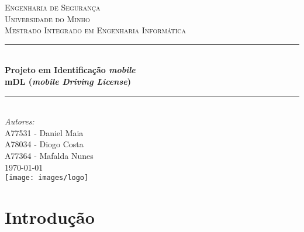 \documentclass[11pt]{article}
\begin{document}
\sloppy

\begin{titlepage}

\newcommand{\HRule}{\rule{\linewidth}{0.5mm}}

\center %
 
\textsc{\LARGE Engenharia de Segurança}\\[1.5cm]
\textsc{\Large Universidade do Minho}\\[0.5cm]
\textsc{\large Mestrado Integrado em Engenharia Informática}\\[0.6cm]

\vspace{0.8cm}
\HRule \\[0.6cm]
{ \huge \bfseries Projeto em Identificação \textit{mobile}}\\[0.4cm]
{ \Large \bfseries \textbf{mDL} (\textit{mobile Driving License})} \\[0.4cm]
\HRule \\[1.2cm]

\Large \emph{Autores:}\\
A77531 - Daniel Maia\\
A78034 - Diogo Costa\\
A77364 - Mafalda Nunes\\[1.3cm]

{\large \today}\\[1.5cm]

\texttt{[image: images/logo]}\\[1cm]

\vfill %

\end{titlepage}


\begin{abstract}
\end{abstract}

\vspace{0.8cm}

\tableofcontents

\newpage



\section{Introdução}

\end{document}

